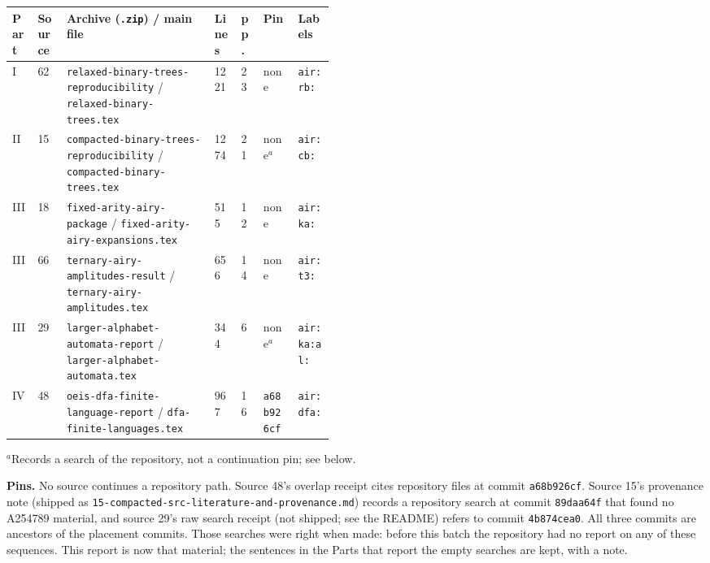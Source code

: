 \documentclass[11pt,letterpaper]{article}
\numberwithin{equation}{section}
\theoremstyle{remark}
\newcommand{\repopath}[1]{\nolinkurl{#1}}
\begin{document}
\begin{center}
\footnotesize\setlength{\tabcolsep}{3.5pt}
\begin{tabular}{@{}llp{0.46\linewidth}llll@{}}
\toprule
Part & Source & Archive (\texttt{.zip}) / main file & Lines & pp. & Pin & Labels\\
\midrule
I & 62 & \repopath{relaxed-binary-trees-reproducibility} / \repopath{relaxed-binary-trees.tex} & 1221 & 23 & none & \texttt{air:rb:}\\
II & 15 & \repopath{compacted-binary-trees-reproducibility} / \repopath{compacted-binary-trees.tex} & 1274 & 21 & none$^{a}$ & \texttt{air:cb:}\\
III & 18 & \repopath{fixed-arity-airy-package} / \repopath{fixed-arity-airy-expansions.tex} & 515 & 12 & none & \texttt{air:ka:}\\
III & 66 & \repopath{ternary-airy-amplitudes-result} / \repopath{ternary-airy-amplitudes.tex} & 656 & 14 & none & \texttt{air:t3:}\\
III & 29 & \repopath{larger-alphabet-automata-report} / \repopath{larger-alphabet-automata.tex} & 344 & 6 & none$^{a}$ & \texttt{air:ka:al:}\\
IV & 48 & \repopath{oeis-dfa-finite-language-report} / \repopath{dfa-finite-languages.tex} & 967 & 16 & \texttt{a68b926cf} & \texttt{air:dfa:}\\
\bottomrule
\end{tabular}

\smallskip
\raggedright $^{a}$Records a search of the repository, not a continuation pin; see below.
\end{center}

\textbf{Pins.} No source continues a repository path. Source 48's overlap receipt cites repository files at commit \texttt{a68b926cf}. Source 15's provenance note (shipped as \repopath{15-compacted-src-literature-and-provenance.md}) records a repository search at commit \texttt{89daa64f} that found no A254789 material, and source 29's raw search receipt (not shipped; see the README) refers to commit \texttt{4b874cea0}. All three commits are ancestors of the placement commits. Those searches were right when made: before this batch the repository had no report on any of these sequences. This report is now that material; the sentences in the Parts that report the empty searches are kept, with a note.
\end{document}
